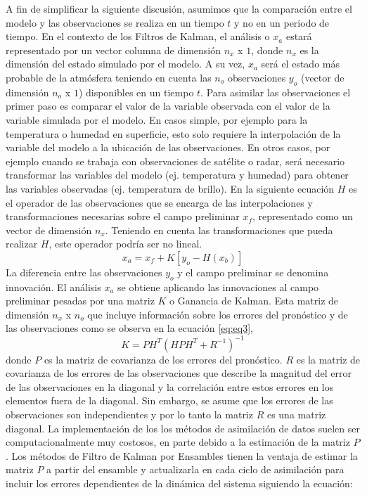 \documentclass[12pt,oneside,a4paper]{reedthesis}
\begin{document}
A fin de simplificar la siguiente discusión, asumimos que la comparación entre el modelo y las observaciones se realiza en un tiempo \(t\) y no en un periodo de tiempo. En el contexto de los Filtros de Kalman, el análisis o \(x_a\) estará representado por un vector columna de dimensión \(n_x\) x \(1\), donde \(n_x\) es la dimensión del estado simulado por el modelo. A su vez, \(x_a\) será el estado más probable de la atmósfera teniendo en cuenta las \(n_o\) observaciones \(y_o\) (vector de dimensión \(n_o\) x \(1\)) disponibles en un tiempo \(t\). Para asimilar las observaciones el primer paso es comparar el valor de la variable observada con el valor de la variable simulada por el modelo. En casos simple, por ejemplo para la temperatura o humedad en superficie, esto solo requiere la interpolación de la variable del modelo a la ubicación de las observaciones. En otros casos, por ejemplo cuando se trabaja con observaciones de satélite o radar, será necesario transformar las variables del modelo (ej. temperatura y humedad) para obtener las variables observadas (ej. temperatura de brillo). En la siguiente ecuación \(H\) es el operador de las observaciones que se encarga de las interpolaciones y transformaciones necesarias sobre el campo preliminar \(x_f\), representado como un vector de dimensión \(n_x\). Teniendo en cuenta las transformaciones que pueda realizar \(H\), este operador podría ser no lineal.
\begin{equation}
x_a = x_f + K[y_o - H(x_b )]
\label{eq:eq1}
\end{equation}
La diferencia entre las observaciones \(y_o\) y el campo preliminar se denomina innovación. El análisis \(x_a\) se obtiene aplicando las innovaciones al campo preliminar pesadas por una matriz \(K\) o Ganancia de Kalman. Esta matriz de dimensión \(n_x\) x \(n_o\) que incluye información sobre los errores del pronóstico y de las observaciones como se observa en la ecuación \eqref{eq:eq3},
\begin{equation}
K = PH^T (HPH^T + R^{-1})^{-1}
\label{eq:eq3}
\end{equation}
donde \(P\) es la matriz de covarianza de los errores del pronóstico. \(R\) es la matriz de covarianza de los errores de las observaciones que describe la magnitud del error de las observaciones en la diagonal y la correlación entre estos errores en los elementos fuera de la diagonal. Sin embargo, se asume que los errores de las observaciones son independientes y por lo tanto la matriz \(R\) es una matriz diagonal. La implementación de los los métodos de asimilación de datos suelen ser computacionalmente muy costosos, en parte debido a la estimación de la matriz \(P\). Los métodos de Filtro de Kalman por Ensambles tienen la ventaja de estimar la matriz \(P\) a partir del ensamble y actualizarla en cada ciclo de asimilación para incluir los errores dependientes de la dinámica del sistema siguiendo la ecuación:
\end{document}
